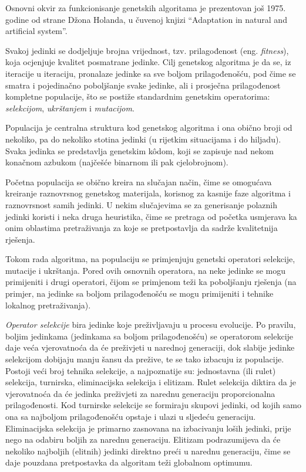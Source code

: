 \documentclass[a4paper, utf8, 11pt, colorlinks]{book}
\theoremstyle{definition}
\begin{document}
Osnovni okvir za funkcionisanje genetskih algoritama je prezentovan još 1975. godine od strane Džona Holanda, u čuvenoj knjizi ``Adaptation in natural and artificial system''.

Svakoj jedinki se dodjeljuje brojna vrijednost, tzv. prilagođenost (eng.  \emph{fitness}), koja ocjenjuje kvalitet posmatrane jedinke. Cilj genetskog algoritma je da se, iz iteracije u iteraciju, pronalaze jedinke sa sve boljom prilagođenošću, pod čime se smatra i pojedinačno poboljšanje svake jedinke, ali i prosječna prilagođenost kompletne populacije, što se postiže standardnim genetskim operatorima: \textit{selekcijom}, \textit{ukrštanjem} i \textit{mutacijom}.

Populacija je centralna struktura kod genetskog algoritma i ona  obično broji od nekoliko, pa do nekoliko stotina jedinki (u rijetkim situacijama i do hiljadu). Svaka jedinka se predstavlja genetskim k\^odom, koji se zapisuje nad nekom konačnom azbukom (najčešće binarnom ili pak cjelobrojnom).


Početna populacija se obično kreira na slučajan način, čime se omogućava kreiranje raznovrsnog genetskog materijala, korisnog za kasnije faze algoritma i raznovrsnost samih jedinki. U nekim slučajevima se za generisanje polaznih jedinki koristi i neka druga heuristika, čime se pretraga od početka usmjerava ka onim oblastima pretraživanja za koje se pretpostavlja da sadrže kvalitetnija rješenja.

Tokom rada algoritma, na populaciju se primjenjuju genetski operatori selekcije, mutacije i ukrštanja. Pored ovih osnovnih operatora, na neke jedinke se mogu primijeniti i drugi operatori, čijom se primjenom teži ka poboljšanju rješenja (na primjer, na jedinke sa boljom prilagođenošću se mogu primijeniti i tehnike lokalnog  pretraživanja).

\emph{Operator selekcije} bira jedinke koje preživljavaju u procesu evolucije. Po pravilu, boljim jedinkama (jedinkama sa boljom prilagođenošću) se operatorom selekcije daje veća vjerovatnoća da će preživjeti u narednoj generaciji, dok  slabije jedinke selekcijom dobijaju manju šansu da prežive, te se tako izbacuju iz populacije. Postoji veći broj tehnika selekcije, a najpoznatije su: jednostavna (ili rulet) selekcija, turnirska, eliminacijska selekcija i elitizam. Rulet selekcija diktira da je vjerovatnoća da će jedinka preživjeti za narednu generaciju proporcionalna prilagođenosti. Kod turnirske selekcije se formiraju skupovi jedinki, od kojih samo ona sa najboljom prilagođenošću opstaje i ulazi u sljedeću generaciju. Eliminacijska selekcija je primarno zasnovana na izbacivanju loših jedinki, prije nego na odabiru boljih za narednu generaciju. Elitizam podrazumijeva da će nekoliko najboljih (elitnih) jedinki direktno preći u narednu generaciju, čime se daje pouzdana pretpostavka da  algoritam teži globalnom optimumu.
\end{document}
